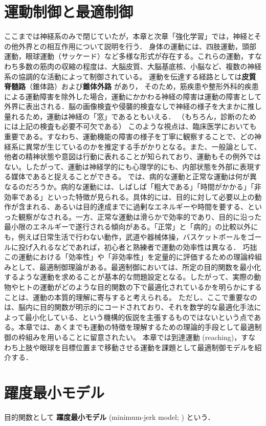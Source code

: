 \section{運動制御と最適制御}
ここまでは神経系のみで閉じていたが，本章と次章「強化学習」では，神経とその他外界との相互作用について説明を行う．
身体の運動には、四肢運動，頭部運動，眼球運動（サッケード）など多様な形式が存在する。これらの運動，すなわち多数の筋肉の収縮の程度は、大脳皮質、大脳基底核、小脳など、複数の神経系の協調的な活動によって制御されている。
運動を伝達する経路としては\textbf{皮質脊髄路}（錐体路）および\textbf{錐体外路} があり，
そのため，筋疾患や整形外科的疾患による運動障害を除外した場合，運動にかかわる神経の障害は運動の障害として外界に表出される．脳の画像検査や侵襲的検査なしで神経の様子を大まかに推し量れるため，運動は神経の「窓」であるともいえる．
（もちろん，診断のためには上記の検査も必要不可欠である）
このような視点は、臨床医学においても重要である。すなわち、運動機能の障害の様子を丁寧に観察することで、どの神経系に異常が生じているのかを推定する手がかりとなる。また、一般論として、他者の精神状態や意図は行動に表れることが知られており、運動もその例外ではない。したがって、運動は神経学的にも心理学的にも、内部状態を外部に表現する媒体であると捉えることができる。
では、病的な運動と正常な運動は何が異なるのだろうか。病的な運動には、しばしば「粗大である」「時間がかかる」「非効率である」といった特徴が見られる。具体的には、目的に対して必要以上の動作が含まれる、あるいは目的達成までに過剰なエネルギーや時間を要する、といった観察がなされる。一方、正常な運動は滑らかで効率的であり、目的に沿った最小限のエネルギーで遂行される傾向がある。「正常」と「病的」の比較以外にも，例えば日常生活で行わない動作，武道や器械体操，バスケットボールをゴールに投げ入れるなどであれば，初心者と熟練者で運動の効率性は異なる．
巧拙
この運動における「効率性」や「非効率性」を定量的に評価するための理論枠組みとして、最適制御理論がある。最適制御においては、所定の目的関数を最小化するような運動を求めることが基本的な問題設定となる。したがって、実際の動物やヒトの運動がどのような目的関数の下で最適化されているかを明らかにすることは、運動の本質的理解に寄与すると考えられる。
ただし、ここで重要なのは、脳内に目的関数が明示的にコードされており、それを数学的な最適化手法によって最小化している、という機構的仮説を主張するものではないという点である。本章では、あくまでも運動の特徴を理解するための理論的手段として最適制御の枠組みを用いることに留意されたい。
本章では到達運動 (reaching)，すなわち上肢や眼球を目標位置まで移動させる運動を課題として最適制御モデルを紹介する．
\section{躍度最小モデル}
目的関数として
\textbf{躍度最小モデル} (minimum-jerk model; \citep{Flash1985-vj}) という．
